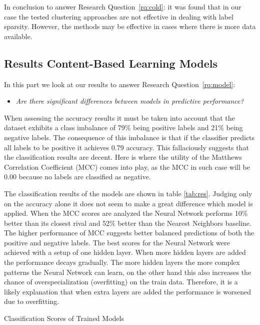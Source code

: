 In conclusion to answer Research Question~\ref{rq:cold}: it was found that in our case the tested clustering approaches are not effective in dealing with label sparsity.
However, the methods may be effective in cases where there is more data available.

\subsection{Results Content-Based Learning Models}
\label{ssec:rcblm}

In this part we look at our results to answer Research Question~\ref{rq:model}:
\begin{itemize}
	\item[] \em Are there significant differences between models in predictive performance?
\end{itemize}

\noindent When assessing the accuracy results it must be taken into account that the dataset exhibits a class imbalance of 79\% being positive labels and 21\% being negative labels.
The consequence of this imbalance is that if the classifier predicts all labels to be positive it achieves 0.79 accuracy.
This fallaciously suggests that the classification results are decent.
Here is where the utility of the Matthews Correlation Coefficient (MCC) comes into play, as the MCC in such case will be 0.00 because no labels are classified as negative.

The classification results of the models are shown in table \ref{tab:res}.
Judging only on the accuracy alone it does not seem to make a great difference which model is applied.
When the MCC scores are analyzed the Neural Network performs 10\% better than its closest rival and 52\% better than the Nearest Neighbors baseline.
The higher performance of MCC suggests better balanced predictions of both the positive and negative labels.
The best scores for the Neural Network were achieved with a setup of one hidden layer.
When more hidden layers are added the performance decays gradually.
The more hidden layers the more complex patterns the Neural Network can learn, on the other hand this also increases the chance of overspecialization (overfitting) on the train data.
Therefore, it is a likely explanation that when extra layers are added the performance is worsened due to overfitting.

\begin{table}[h]
\begin{footnotesize}

\end{footnotesize}
\caption{\label{tab:res} \footnotesize{Classification Scores of Trained Models}}
\end{table}

